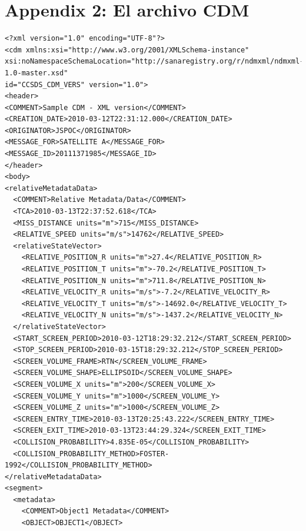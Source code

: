 

\section{Appendix 2: El archivo CDM}
\label{App2}

\lstset{language=XML,basicstyle=\small}
\begin{lstlisting}
<?xml version="1.0" encoding="UTF-8"?>
<cdm xmlns:xsi="http://www.w3.org/2001/XMLSchema-instance"
xsi:noNamespaceSchemaLocation="http://sanaregistry.org/r/ndmxml/ndmxml-1.0-master.xsd"
id="CCSDS_CDM_VERS" version="1.0">
<header>
<COMMENT>Sample CDM - XML version</COMMENT>
<CREATION_DATE>2010-03-12T22:31:12.000</CREATION_DATE>
<ORIGINATOR>JSPOC</ORIGINATOR>
<MESSAGE_FOR>SATELLITE A</MESSAGE_FOR>
<MESSAGE_ID>20111371985</MESSAGE_ID>
</header>
<body>
<relativeMetadataData>
  <COMMENT>Relative Metadata/Data</COMMENT>
  <TCA>2010-03-13T22:37:52.618</TCA>
  <MISS_DISTANCE units="m">715</MISS_DISTANCE>
  <RELATIVE_SPEED units="m/s">14762</RELATIVE_SPEED>
  <relativeStateVector>
    <RELATIVE_POSITION_R units="m">27.4</RELATIVE_POSITION_R>
    <RELATIVE_POSITION_T units="m">-70.2</RELATIVE_POSITION_T>
    <RELATIVE_POSITION_N units="m">711.8</RELATIVE_POSITION_N>
    <RELATIVE_VELOCITY_R units="m/s">-7.2</RELATIVE_VELOCITY_R>
    <RELATIVE_VELOCITY_T units="m/s">-14692.0</RELATIVE_VELOCITY_T>
    <RELATIVE_VELOCITY_N units="m/s">-1437.2</RELATIVE_VELOCITY_N>
  </relativeStateVector>
  <START_SCREEN_PERIOD>2010-03-12T18:29:32.212</START_SCREEN_PERIOD>
  <STOP_SCREEN_PERIOD>2010-03-15T18:29:32.212</STOP_SCREEN_PERIOD>
  <SCREEN_VOLUME_FRAME>RTN</SCREEN_VOLUME_FRAME>
  <SCREEN_VOLUME_SHAPE>ELLIPSOID</SCREEN_VOLUME_SHAPE>
  <SCREEN_VOLUME_X units="m">200</SCREEN_VOLUME_X>
  <SCREEN_VOLUME_Y units="m">1000</SCREEN_VOLUME_Y>
  <SCREEN_VOLUME_Z units="m">1000</SCREEN_VOLUME_Z>
  <SCREEN_ENTRY_TIME>2010-03-13T20:25:43.222</SCREEN_ENTRY_TIME>
  <SCREEN_EXIT_TIME>2010-03-13T23:44:29.324</SCREEN_EXIT_TIME>
  <COLLISION_PROBABILITY>4.835E-05</COLLISION_PROBABILITY>
  <COLLISION_PROBABILITY_METHOD>FOSTER-1992</COLLISION_PROBABILITY_METHOD>
</relativeMetadataData>
<segment>
  <metadata>
    <COMMENT>Object1 Metadata</COMMENT>
    <OBJECT>OBJECT1</OBJECT>

\end{lstlisting}
